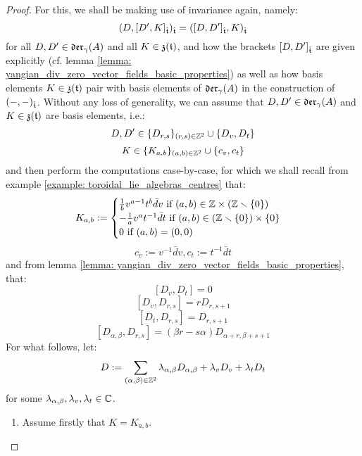             \begin{proof}
                For this, we shall be making use of invariance again, namely:
                    $$(D, [D', K]_{\hat{\mathfrak{t}}})_{\hat{\mathfrak{t}}} = ([D, D']_{\hat{\mathfrak{t}}}, K)_{\hat{\mathfrak{t}}}$$
                for all $D, D' \in \mathfrak{der}_{\gamma}(A)$ and all $K \in \mathfrak{z}(\mathfrak{t})$, and how the brackets $[D, D']_{\hat{\mathfrak{t}}}$ are given explicitly (cf. lemma \ref{lemma: yangian_div_zero_vector_fields_basic_properties}) as well as how basis elements $K \in \mathfrak{z}(\mathfrak{t})$ pair with basis elements of $\mathfrak{der}_{\gamma}(A)$ in the construction of $(-, -)_{\hat{\mathfrak{t}}}$. Without any loss of generality, we can assume that $D, D' \in \mathfrak{der}_{\gamma}(A)$ and $K \in \mathfrak{z}(\mathfrak{t})$ are basis elements, i.e.:
                    $$D, D' \in \{D_{r, s}\}_{(r, s) \in \mathbb{Z}^2} \cup \{D_v, D_t\}$$
                    $$K \in \{K_{a, b}\}_{(a, b) \in \mathbb{Z}^2} \cup \{c_v, c_t\}$$
                and then perform the computations case-by-case, for which we shall recall from example \ref{example: toroidal_lie_algebras_centres} that:
                    $$
                        K_{a, b} :=
                        \begin{cases}
                            \text{$\frac1b v^{a - 1} t^b \bar{d}v$ if $(a, b) \in \Z \x (\Z \setminus \{0\})$}
                            \\
                            \text{$-\frac1a v^a t^{-1} \bar{d}t$ if $(a, b) \in (\Z \setminus \{0\}) \x \{0\}$}
                            \\
                            \text{$0$ if $(a, b) = (0, 0)$}
                        \end{cases}
                    $$
                    $$c_v := v^{-1} \bar{d}v, c_t := t^{-1} \bar{d}t$$
                and from lemma \ref{lemma: yangian_div_zero_vector_fields_basic_properties}, that:
                    $$[D_v, D_t] = 0$$
                    $$[D_v, D_{r, s}] = r D_{r, s + 1}$$
                    $$[D_t, D_{r, s}] = D_{r, s + 1}$$
                    $$[D_{\alpha, \beta}, D_{r, s}] = (\beta r - s \alpha) D_{\alpha + r, \beta + s + 1}$$
                For what follows, let:
                    $$D := \sum_{(\alpha, \beta) \in \mathbb{Z}^2} \lambda_{\alpha, \beta} D_{\alpha, \beta} + \lambda_v D_v + \lambda_t D_t$$
                for some $\lambda_{\alpha, \beta}, \lambda_v, \lambda_t \in \mathbb{C}$.
                \begin{enumerate}
                    \item Assume firstly that $K = K_{a, b}$.

\end{enumerate}
\end{proof}
